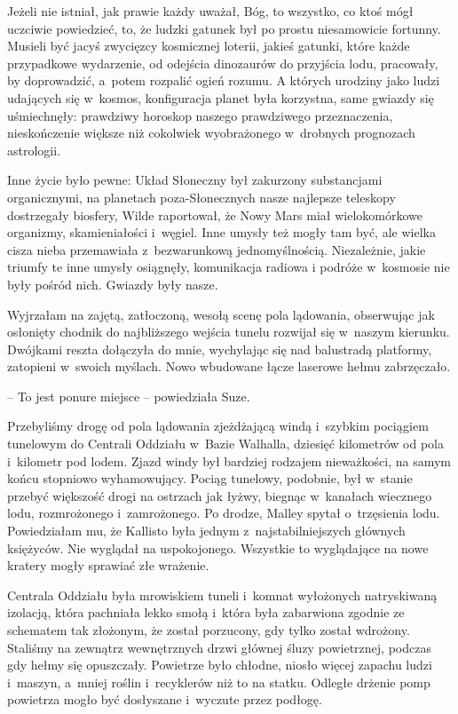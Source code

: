 \documentclass[oneside,polish,11pt,sfheadings]{mwbk}
\begin{document}
Jeżeli nie istniał, jak prawie każdy uważał, Bóg, to wszystko, co ktoś
mógł uczciwie powiedzieć, to, że ludzki gatunek był po prostu
niesamowicie fortunny. Musieli być jacyś zwycięzcy kosmicznej loterii,
jakieś gatunki, które każde przypadkowe wydarzenie, od odejścia
dinozaurów do przyjścia lodu, pracowały, by doprowadzić, a~potem
rozpalić ogień rozumu. A których urodziny jako ludzi udających się w~kosmos, konfiguracja planet była korzystna, same gwiazdy się
uśmiechnęły: prawdziwy horoskop naszego prawdziwego przeznaczenia,
nieskończenie większe niż cokolwiek wyobrażonego w~drobnych prognozach
astrologii.

Inne życie było pewne: Układ Słoneczny był zakurzony substancjami
organicznymi, na planetach poza-Słonecznych nasze najlepsze teleskopy
dostrzegały biosfery, Wilde raportował, że Nowy Mars miał wielokomórkowe
organizmy, skamieniałości i~węgiel. Inne umysły też mogły tam być, ale
wielka cisza nieba przemawiała z~bezwarunkową jednomyślnością.
Niezależnie, jakie triumfy te inne umysły osiągnęły, komunikacja radiowa
i podróże w~kosmosie nie były pośród nich. Gwiazdy były nasze.

Wyjrzałam na zajętą, zatłoczoną, wesołą scenę pola lądowania, obserwując
jak osłonięty chodnik do najbliższego wejścia tunelu rozwijał się w~naszym kierunku. Dwójkami reszta dołączyła do mnie, wychylając się nad
balustradą platformy, zatopieni w~swoich myślach. Nowo wbudowane łącze
laserowe hełmu zabrzęczało.

-- To jest ponure miejsce -- powiedziała Suze.

Przebyliśmy drogę od pola lądowania zjeżdżającą windą i~szybkim
pociągiem tunelowym do Centrali Oddziału w~Bazie Walhalla, dziesięć
kilometrów od pola i~kilometr pod lodem. Zjazd windy był bardziej
rodzajem nieważkości, na samym końcu stopniowo wyhamowujący. Pociąg
tunelowy, podobnie, był w~stanie przebyć większość drogi na ostrzach jak
łyżwy, biegnąc w~kanałach wiecznego lodu, rozmrożonego i~zamrożonego. Po
drodze, Malley spytał o~trzęsienia lodu. Powiedziałam mu, że Kallisto
była jednym z~najstabilniejszych głównych księżyców. Nie wyglądał na
uspokojonego. Wszystkie to wyglądające na nowe kratery mogły sprawiać
złe wrażenie.

Centrala Oddziału była mrowiskiem tuneli i~komnat wyłożonych
natryskiwaną izolacją, która pachniała lekko smołą i~która była
zabarwiona zgodnie ze schematem tak złożonym, że został porzucony, gdy
tylko został wdrożony. Staliśmy na zewnątrz wewnętrznych drzwi głównej
śluzy powietrznej, podczas gdy hełmy się opuszczały. Powietrze było
chłodne, niosło więcej zapachu ludzi i~maszyn, a~mniej roślin i~recyklerów niż to na statku. Odległe drżenie pomp powietrza mogło być
dosłyszane i~wyczute przez podłogę.
\end{document}
